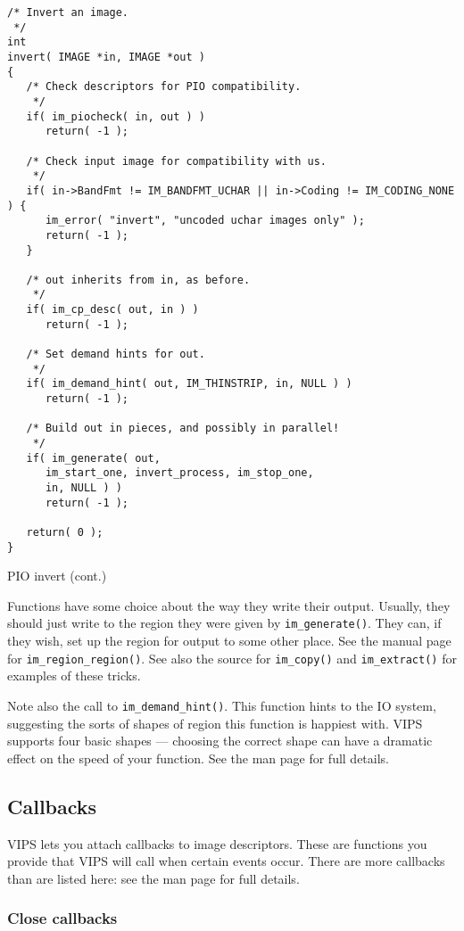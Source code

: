 \begin{fig2}
\begin{verbatim}
/* Invert an image.
 */
int
invert( IMAGE *in, IMAGE *out )
{
   /* Check descriptors for PIO compatibility.
    */
   if( im_piocheck( in, out ) )
      return( -1 );

   /* Check input image for compatibility with us.
    */
   if( in->BandFmt != IM_BANDFMT_UCHAR || in->Coding != IM_CODING_NONE ) {
      im_error( "invert", "uncoded uchar images only" );
      return( -1 );
   }

   /* out inherits from in, as before.
    */
   if( im_cp_desc( out, in ) )
      return( -1 );

   /* Set demand hints for out.
    */
   if( im_demand_hint( out, IM_THINSTRIP, in, NULL ) )
      return( -1 );

   /* Build out in pieces, and possibly in parallel!
    */
   if( im_generate( out,
      im_start_one, invert_process, im_stop_one,
      in, NULL ) )
      return( -1 );

   return( 0 );
}    
\end{verbatim}
\caption{PIO invert (cont.)}
\end{fig2}

Functions have some choice about the way they write their output. Usually, they
should just write to the region they were given by \verb+im_generate()+. They
can, if they wish, set up the region for output to some other place. See
the manual page for \verb+im_region_region()+.  See also the source for
\verb+im_copy()+ and \verb+im_extract()+ for examples of these tricks.

Note also the call to \verb+im_demand_hint()+. This function hints to the IO
system, suggesting the sorts of shapes of region this function is happiest
with. VIPS supports four basic shapes --- choosing the correct shape can
have a dramatic effect on the speed of your function. See the man page for
full details.

\subsection{Callbacks}
\label{sec:callback}

VIPS lets you attach callbacks to image descriptors. These are functions
you provide that VIPS will call when certain events occur. There are more
callbacks than are listed here: see the man page for full details.

\subsubsection{Close callbacks}

